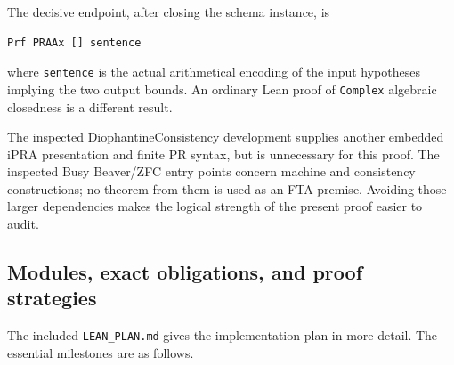 \documentclass[11pt,letterpaper]{article}
\theoremstyle{definition}\newtheorem{definition}[theorem]{Definition}
\theoremstyle{remark}\newtheorem{remark}[theorem]{Remark}
\begin{document}
The decisive endpoint, after closing the schema instance, is
\begin{lstlisting}
Prf PRAAx [] sentence
\end{lstlisting}
where \texttt{sentence} is the actual arithmetical encoding of the input
hypotheses implying the two output bounds. An ordinary Lean proof of
\texttt{Complex} algebraic closedness is a different result.

The inspected DiophantineConsistency development supplies another
embedded iPRA presentation and finite PR syntax, but is unnecessary for
this proof. The inspected Busy Beaver/ZFC entry points concern machine
and consistency constructions; no theorem from them is used as an FTA
premise. Avoiding those larger dependencies makes the logical strength of
the present proof easier to audit.

\subsection{Modules, exact obligations, and proof strategies}

The included \texttt{LEAN\_PLAN.md} gives the implementation plan in more
detail. The essential milestones are as follows.
\end{document}
